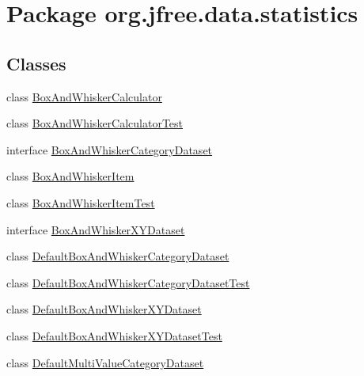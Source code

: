 \hypertarget{namespaceorg_1_1jfree_1_1data_1_1statistics}{}\section{Package org.\+jfree.\+data.\+statistics}
\label{namespaceorg_1_1jfree_1_1data_1_1statistics}
\subsection*{Classes}
\begin{DoxyCompactItemize}
\item 
class \mbox{\hyperlink{classorg_1_1jfree_1_1data_1_1statistics_1_1_box_and_whisker_calculator}{Box\+And\+Whisker\+Calculator}}
\item 
class \mbox{\hyperlink{classorg_1_1jfree_1_1data_1_1statistics_1_1_box_and_whisker_calculator_test}{Box\+And\+Whisker\+Calculator\+Test}}
\item 
interface \mbox{\hyperlink{interfaceorg_1_1jfree_1_1data_1_1statistics_1_1_box_and_whisker_category_dataset}{Box\+And\+Whisker\+Category\+Dataset}}
\item 
class \mbox{\hyperlink{classorg_1_1jfree_1_1data_1_1statistics_1_1_box_and_whisker_item}{Box\+And\+Whisker\+Item}}
\item 
class \mbox{\hyperlink{classorg_1_1jfree_1_1data_1_1statistics_1_1_box_and_whisker_item_test}{Box\+And\+Whisker\+Item\+Test}}
\item 
interface \mbox{\hyperlink{interfaceorg_1_1jfree_1_1data_1_1statistics_1_1_box_and_whisker_x_y_dataset}{Box\+And\+Whisker\+X\+Y\+Dataset}}
\item 
class \mbox{\hyperlink{classorg_1_1jfree_1_1data_1_1statistics_1_1_default_box_and_whisker_category_dataset}{Default\+Box\+And\+Whisker\+Category\+Dataset}}
\item 
class \mbox{\hyperlink{classorg_1_1jfree_1_1data_1_1statistics_1_1_default_box_and_whisker_category_dataset_test}{Default\+Box\+And\+Whisker\+Category\+Dataset\+Test}}
\item 
class \mbox{\hyperlink{classorg_1_1jfree_1_1data_1_1statistics_1_1_default_box_and_whisker_x_y_dataset}{Default\+Box\+And\+Whisker\+X\+Y\+Dataset}}
\item 
class \mbox{\hyperlink{classorg_1_1jfree_1_1data_1_1statistics_1_1_default_box_and_whisker_x_y_dataset_test}{Default\+Box\+And\+Whisker\+X\+Y\+Dataset\+Test}}
\item 
class \mbox{\hyperlink{classorg_1_1jfree_1_1data_1_1statistics_1_1_default_multi_value_category_dataset}{Default\+Multi\+Value\+Category\+Dataset}}

\end{DoxyCompactItemize}
